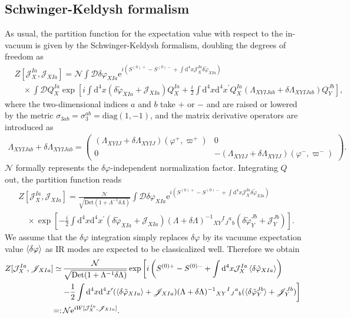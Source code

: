 \documentclass[aps, prd
, preprint
, nofootinbib 
, longbibliography
]{revtex4-1}
\newcommand{\dd}{\mathrm{d}}
\newcommand{\ee}{\mathrm{e}}
\newcommand{\diag}{\mathrm{diag}}
\newcommand{\Det}{\mathrm{Det}}
\newcommand{\scrD}{\mathscr{D}}
\newcommand{\calJ}{\mathcal{J}}
\newcommand{\scrJ}{\mathscr{J}}
\newcommand{\calN}{\mathcal{N}}
\newcommand{\bae}[1]{\begin{align} #1 \end{align}}
\newcommand{\bpme}[1]{\begin{pmatrix} #1 \end{pmatrix}}
\begin{document}
\subsection{Schwinger-Keldysh formalism}

As usual, the partition function for the expectation value with respect to the in-vacuum is given by the Schwinger-Keldysh formalism, doubling the degrees of freedom as
\bae{
    &Z[\calJ_X^{Ia},\scrJ_{XIa}]=\calN\int\scrD\delta\varphi_{XIa}\ee^{i(S^{(0)+}-S^{(0)-}+\int\dd^4x\calJ_X^{Ia}\delta\tilde{\varphi}_{XIa})} \nonumber \\
    &\quad\times\int\scrD Q^{Ia}_X\exp\left[i\int\dd^4x(\delta\tilde{\varphi}_{XIa}+\scrJ_{XIa})Q^{Ia}_X+\frac{i}{2}\int\dd^4x\dd^4x^\prime Q^{Ia}_X(\Lambda_{XYIJab}+\delta\Lambda_{XYIJab})Q^{Jb}_Y\right],
}
where the two-dimensional indices $a$ and $b$ take $+$ or $-$ and are raised or lowered by the metric $\sigma_{3ab}=\sigma_3^{ab}=\diag(1,-1)$, and the matrix derivative operators are introduced as
\bae{
    \Lambda_{XYIJab}+\delta\Lambda_{XYIJab}
    =\bpme{
        (\Lambda_{XYIJ}+\delta\Lambda_{XYIJ})(\varphi^+,\varpi^+) & 0 \\ 0 & -(\Lambda_{XYIJ}+\delta\Lambda_{XYIJ})(\varphi^-,\varpi^-)
    }.
}
$\calN$ formally represents the $\delta\varphi$-independent normalization factor.
Integrating $Q$ out, the partition function reads
\bae{
    &Z[\calJ^{Ia}_X,\scrJ_{XIa}]=\frac{\calN}{\sqrt{\Det(1+\Lambda^{-1}\delta\Lambda)}}\int\scrD\delta\varphi_{XIa}\ee^{i(S^{(0)+}-S^{(0)-}+\int\dd^4x\scrJ^{Ia}_X\delta\tilde{\varphi}_{XIa})} \nonumber \\
    &\quad\times\exp\left[-\frac{i}{2}\int\dd^4x\dd^4x^\prime(\delta\tilde{\varphi}_{XIa}+\scrJ_{XIa})(\Lambda+\delta\Lambda)^{-1}{}_{XY}{}^I{}_J{}^a{}_b(\delta\tilde{\varphi}_Y^{Jb}+\scrJ_Y^{Jb})\right].
}
We assume that the $\delta\varphi$ integration simply replaces $\delta\varphi$ by its vacuume expectation value $\braket{\delta\varphi}$ as IR modes are expected to be classicalized well.
Therefore we obtain
\bae{
    Z[\calJ^{Ia}_X,\scrJ_{XIa}]\simeq&\,\frac{\calN}{\sqrt{\Det(1+\Lambda^{-1}\delta\Lambda)}}\exp\left[i\left(S^{(0)+}-S^{(0)-}+\int\dd^4x\calJ_X^{Ia}\braket{\delta\tilde{\varphi}_{XIa}}\right)\right. \nonumber \\
    &\left.-\frac{1}{2}\int\dd^4x\dd^4x^\prime(\braket{\delta\tilde{\varphi}_{XIa}}+\scrJ_{XIa})(\Lambda+\delta\Lambda)^{-1}{}_{XY}{}^I{}_J{}^a{}_b(\braket{\delta\tilde{\varphi}_Y^{Jb}}+\scrJ_Y^{Jb})\right] \nonumber \\
    =:&\,\calN\ee^{iW[\calJ_X^{Ia},\scrJ_{XIa}]}.
}
\end{document}
